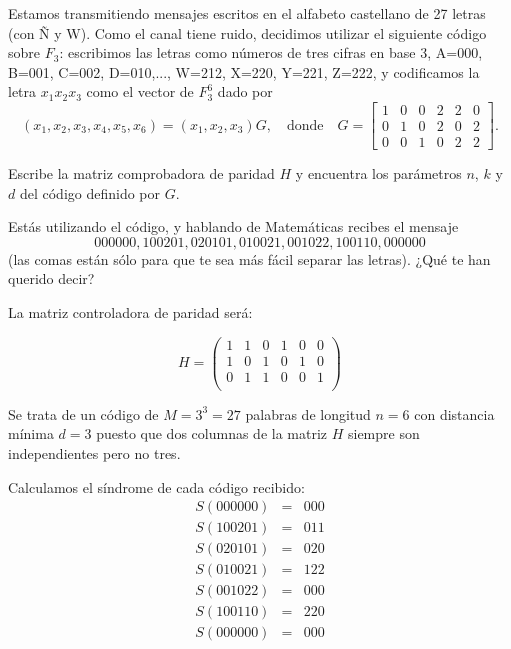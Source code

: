 \begin{problem}[5]
 Estamos transmitiendo mensajes escritos en el alfabeto
castellano de 27 letras (con Ñ y W). Como el canal tiene ruido,
decidimos utilizar el siguiente código sobre $ F_3$: escribimos
las letras como números de tres cifras en base 3, A=000, B=001,
C=002, D=010,..., W=212, X=220, Y=221, Z=222, y codificamos la
letra $x_1x_2x_3$ como el vector de $ F_3^6$ dado por
$$(x_1,x_2,x_3,x_4,x_5,x_6)=(x_1,x_2,x_3)G, \quad\text{donde}\quad
G=\left[\begin{array}{cccccc} 1&0&0&2&2&0\\ 0&1&0&2&0&2\\
0&0&1&0&2&2
\end{array}\right].$$

\ppart Escribe la matriz comprobadora de paridad $H$ y encuentra los
parámetros $n$, $k$ y $d$ del código definido por $G$.

\ppart Estás utilizando el código, y hablando de Matemáticas recibes
el mensaje $$000000,100201,020101,010021,001022,100110,000000$$
(las comas están sólo para que te sea más fácil separar las
letras). ¿Qué te han querido decir?

\solution


\spart

La matriz controladora de paridad será:

\[H = \left(\begin{array}{cccccc}
1 & 1 & 0 & 1 & 0 & 0 \\
1 & 0 & 1 & 0 & 1 & 0 \\
0 & 1 & 1 & 0 & 0 & 1 \\
\end{array} \right)\]

Se trata de un código de $M=3^3=27$ palabras de longitud $n=6$ con distancia mínima $d=3$ puesto que dos columnas de la matriz $H$ siempre son independientes pero no tres.

\spart

Calculamos el síndrome de cada código recibido:
\[\begin{array}{ccc}
S(000000) & = & 000\\
S(100201) & = & 011\\
S(020101) & = & 020\\
S(010021) & = & 122\\
S(001022) & = & 000\\
S(100110) & = & 220\\
S(000000) & = & 000
\end{array}\]


\end{problem}
